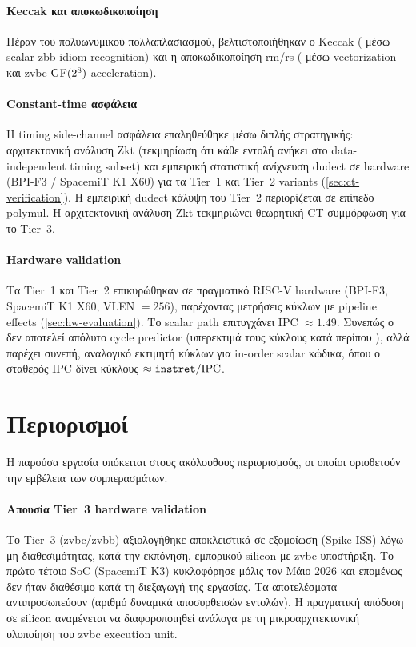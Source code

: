 \paragraph{Keccak και αποκωδικοποίηση}
Πέραν του πολυωνυμικού πολλαπλασιασμού, βελτιστοποιήθηκαν ο Keccak
( μέσω scalar \gls{zbb} idiom recognition) και η
αποκωδικοποίηση \gls{rm}/\gls{rs} ( μέσω
\RVV vectorization και \gls{zvbc} $\mathrm{GF}(2^8)$ acceleration).

\ifTODO
\paragraph{Constant-time ασφάλεια}
Η timing side-channel ασφάλεια επαληθεύθηκε μέσω διπλής στρατηγικής:
αρχιτεκτονική ανάλυση Zkt (τεκμηρίωση ότι κάθε εντολή ανήκει στο
data-independent timing subset) και εμπειρική στατιστική ανίχνευση dudect
σε hardware (BPI-F3 / SpacemiT K1 X60) για τα Tier~1 και Tier~2
variants (\cref{sec:ct-verification}). Η εμπειρική dudect κάλυψη του Tier~2
περιορίζεται σε επίπεδο polymul. Η αρχιτεκτονική ανάλυση Zkt τεκμηριώνει
θεωρητική CT συμμόρφωση για το Tier~3.
\fi

\paragraph{Hardware validation}
Τα Tier~1 και Tier~2 επικυρώθηκαν σε πραγματικό RISC-V hardware (BPI-F3,
SpacemiT K1 X60, VLEN $= \num{256}$), παρέχοντας μετρήσεις κύκλων με pipeline
effects (\cref{sec:hw-evaluation}). Το scalar path επιτυγχάνει IPC $\approx 1.49$. Συνεπώς ο \instret δεν αποτελεί
απόλυτο cycle predictor (υπερεκτιμά τους κύκλους κατά περίπου ), αλλά παρέχει
συνεπή, αναλογικό εκτιμητή κύκλων για in-order scalar κώδικα, όπου ο
σταθερός IPC δίνει κύκλους $\approx \texttt{instret}/\text{IPC}$.

\section{Περιορισμοί}
\label{sec:limitations}

Η παρούσα εργασία υπόκειται στους ακόλουθους περιορισμούς, οι οποίοι
οριοθετούν την εμβέλεια των συμπερασμάτων.

\paragraph{Απουσία Tier~3 hardware validation}
Το Tier~3 (\gls{zvbc}/\gls{zvbb}) αξιολογήθηκε αποκλειστικά σε εξομοίωση (Spike ISS)
λόγω μη διαθεσιμότητας, κατά την εκπόνηση, εμπορικού silicon με \gls{zvbc} υποστήριξη. Το πρώτο τέτοιο SoC (SpacemiT K3) κυκλοφόρησε μόλις τον Μάιο 2026 και επομένως δεν ήταν διαθέσιμο κατά τη διεξαγωγή της εργασίας. Τα
αποτελέσματα αντιπροσωπεύουν \instret (αριθμό δυναμικά αποσυρθεισών εντολών). Η πραγματική απόδοση σε silicon αναμένεται να
διαφοροποιηθεί ανάλογα με τη μικροαρχιτεκτονική υλοποίηση του \gls{zvbc} execution unit.

